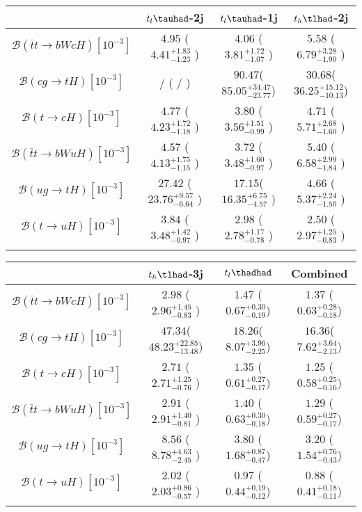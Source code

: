 \centering
\begin{tabular}{cccc} \toprule\toprule
 & $t_l\tauhad$-2j & $t_l\tauhad$-1j & $t_h\tlhad$-2j\\\midrule
$\mathcal{B}(\bar{t}t\to bWcH)[10^{-3}]$     & $4.95$  ($4.41^{+1.83}_{-1.23}$  ) & $4.06$ ($3.81^{+1.72}_{-1.07}$   )& $5.58$ ($6.79^{+3.28}_{-1.90}$   ) \\
$\mathcal{B}(cg\to tH)[10^{-3}]$             &  /      ( /                      ) & $90.47$($85.05^{+34.47}_{-23.77}$)& $30.68$($36.25^{+15.12}_{-10.13}$) \\
$\mathcal{B}(t\to cH)[10^{-3}]$              & $4.77$  ($4.23^{+1.72}_{-1.18}$  ) & $3.80$ ($3.56^{+1.51}_{-0.99}$   ) & $4.71$ ($5.71^{+2.68}_{-1.60}$   ) \\
$\mathcal{B}(\bar{t}t\to bWuH)[10^{-3}]$     & $4.57$  ($4.13^{+1.75}_{-1.15}$  ) & $3.72$ ($3.48^{+1.60}_{-0.97}$   )& $5.40$ ($6.58^{+2.99}_{-1.84}$   ) \\
$\mathcal{B}(ug\to tH)[10^{-3}]$             & $27.42$ ($23.76^{+9.57}_{-6.64}$ ) & $17.15$($16.35^{+6.75}_{-4.57}$  )& $4.66$ ($5.37^{+2.24}_{-1.50}$   ) \\
$\mathcal{B}(t\to uH)[10^{-3}]$              & $3.84$  ($3.48^{+1.42}_{-0.97}$  ) & $2.98$ ($2.78^{+1.17}_{-0.78}$   )& $2.50$ ($2.97^{+1.25}_{-0.83}$   ) \\
\bottomrule\bottomrule\\    
\end{tabular}
\begin{tabular}{cccc} \toprule\toprule
 & $t_h\tlhad$-3j & $t_l\thadhad$ & Combined\\\midrule
$\mathcal{B}(\bar{t}t\to bWcH)[10^{-3}]$ &$2.98$ ($2.96^{+1.45}_{-0.83}$   ) & $1.47$ ($0.67^{+0.30}_{-0.19}$) & $1.37$ ($0.63^{+0.28}_{-0.18}$)\\
$\mathcal{B}(cg\to tH)[10^{-3}]$         &$47.34$($48.23^{+22.85}_{-13.48}$) & $18.26$($8.07^{+3.96}_{-2.25}$) & $16.36$($7.62^{+3.64}_{-2.13}$)\\
$\mathcal{B}(t\to cH)[10^{-3}]$          &$2.71$ ($2.71^{+1.25}_{-0.76}$   ) & $1.35$ ($0.61^{+0.27}_{-0.17}$) & $1.25$ ($0.58^{+0.25}_{-0.16}$)\\
$\mathcal{B}(\bar{t}t\to bWuH)[10^{-3}]$ &$2.91$ ($2.91^{+1.40}_{-0.81}$   ) & $1.40$ ($0.63^{+0.30}_{-0.18}$) & $1.29$ ($0.59^{+0.27}_{-0.17}$)\\
$\mathcal{B}(ug\to tH)[10^{-3}]$         &$8.56$ ($8.78^{+4.63}_{-2.45}$   ) & $3.80$ ($1.68^{+0.87}_{-0.47}$) & $3.20$ ($1.54^{+0.76}_{-0.43}$)\\
$\mathcal{B}(t\to uH)[10^{-3}]$          &$2.02$ ($2.03^{+0.86}_{-0.57}$   ) & $0.97$ ($0.44^{+0.19}_{-0.12}$) & $0.88$ ($0.41^{+0.18}_{-0.11}$)\\
\bottomrule\bottomrule\\
\end{tabular}

